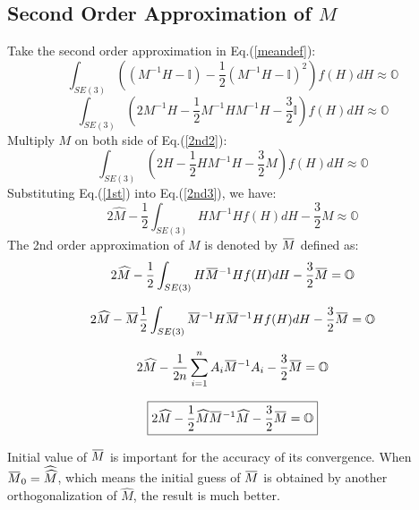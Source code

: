 \documentclass[twocolumn,10pt]{asme2ej}
\newcommand{\II}{\mathbb{I}}
\newcommand{\overbar}[1]{\mkern 1.5mu\overline{\mkern-1.5mu#1\mkern-1.5mu}\mkern 1.5mu}
\begin{document}
\subsection{Second Order Approximation of $M$}
Take the second order approximation in Eq.(\ref{meandef}):
\begin{equation}
\int_{SE(3)} \left((M^{-1}H - \II) - \dfrac{1}{2}(M^{-1}H - \II)^2 \right)f(H)dH \approx \mathbb{O}
\label{2nd1}
\end{equation}
\begin{equation}
\int_{SE(3)} \left( 2M^{-1}H - \dfrac{1}{2}M^{-1}HM^{-1}H - \dfrac{3}{2} \II \right)f(H)dH \approx \mathbb{O}
\label{2nd2}
\end{equation}
Multiply $M$ on both side of Eq.(\ref{2nd2}):
\begin{equation}
\int_{SE(3)} \left( 2H - \dfrac{1}{2}HM^{-1}H -\dfrac{3}{2}M \right)f(H)dH \approx \mathbb{O}
\label{2nd3}
\end{equation}
Substituting Eq.(\ref{1st}) into Eq.(\ref{2nd3}), we have:
\begin{equation}
2\widehat{M} - \dfrac{1}{2}\int_{SE(3)}HM^{-1}Hf(H)dH - \dfrac{3}{2}M \approx \mathbb{O}
\end{equation}
The 2nd order approximation of $M$ is denoted by $\overbar{M}$ defined as:
\begin{equation}
2\widehat{M} - \dfrac{1}{2}\int_{SE(3)}H\overbar{M}^{-1}Hf(H)dH - \dfrac{3}{2}\overbar{M} = \mathbb{O}
\end{equation}

\begin{equation}
2\widehat{M} - \overbar{M}\dfrac{1}{2}\int_{SE(3)}\overbar{M}^{-1}H\overbar{M}^{-1}Hf(H)dH - \dfrac{3}{2}\overbar{M} = \mathbb{O}
\label{2ndm}
\end{equation}

\begin{equation}
2\widehat{M} - \dfrac{1}{2n}\sum_{i=1}^{n}A_{i}\overbar{M}^{-1}A_{i} - \dfrac{3}{2}\overbar{M} = \mathbb{O}
\label{2ndmean}
\end{equation}

\begin{equation}
\boxed{2\widehat{M} - \dfrac{1}{2}\widehat{M}\overbar{M}^{-1}\widehat{M} - \dfrac{3}{2}\overbar{M} = \mathbb{O}}
\end{equation}

Initial value of $\overbar{M}$ is important for the accuracy of its convergence. When $\overbar{M}_0 = \widehat{\widehat{M}}$, which means the initial guess of $\overbar{M}$ is obtained by another orthogonalization of $\widehat{M}$, the result is much better. 
\end{document}
